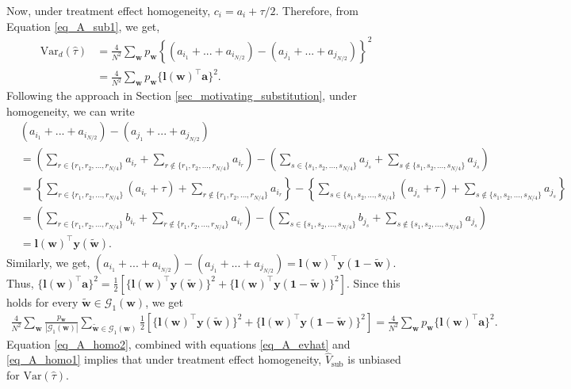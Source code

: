 \documentclass[12pt]{article}
\newcommand{\Var}{{\text{Var}}}
\begin{document}

Now, under treatment effect homogeneity, $c_i = a_i + \tau/2$. Therefore, from Equation \ref{eq_A_sub1}, we get,
\begin{align}
    \Var_d(\hat{\tau}) & = \frac{4}{N^2}\sum_{\bm{w}}p_{\bm{w}} \left\{(a_{i_1}+ ...+ a_{i_{N/2}}) - (a_{j_1}+ ...+ a_{j_{N/2}})\right\}^2 \nonumber \\
    & = \frac{4}{N^2}\sum_{\bm{w}}p_{\bm{w}} \{\bm{l}(\bm{w})^\top \bm{a}\}^2.
    \label{eq_A_homo1}
\end{align}
Following the approach in Section \ref{sec_motivating_substitution}, under homogeneity, we can write 
\begin{align}
&    (a_{i_1}+ ...+ a_{i_{N/2}}) - (a_{j_1}+ ...+ a_{j_{N/2}}) \nonumber \\
& = \left(\sum_{r \in \{r_1,r_2,...,r_{N/4}\}}a_{i_r} + \sum_{r \notin \{r_1,r_2,...,r_{N/4}\}}a_{i_r}\right) - \left(\sum_{s \in \{s_1,s_2,...,s_{N/4}\}}a_{j_s} + \sum_{s \notin \{s_1,s_2,...,s_{N/4}\}}a_{j_s}\right) \nonumber \\
&= \left\{\sum_{r \in \{r_1,r_2,...,r_{N/4}\}}(a_{i_r} + \tau) + \sum_{r \notin \{r_1,r_2,...,r_{N/4}\}}a_{i_r}\right\} - \left\{\sum_{s \in \{s_1,s_2,...,s_{N/4}\}}(a_{j_s} + \tau) + \sum_{s \notin \{s_1,s_2,...,s_{N/4}\}}a_{j_s}\right\} \nonumber \\
&= \left(\sum_{r \in \{r_1,r_2,...,r_{N/4}\}}b_{i_r} + \sum_{r \notin \{r_1,r_2,...,r_{N/4}\}}a_{i_r}\right) - \left(\sum_{s \in \{s_1,s_2,...,s_{N/4}\}}b_{j_s} + \sum_{s \notin \{s_1,s_2,...,s_{N/4}\}}a_{j_s}\right) \nonumber \\
&= \bm{l}(\bm{w})^\top\bm{y}(\tilde{\bm{w}}).
\end{align}
Similarly, we get, $(a_{i_1}+ ...+ a_{i_{N/2}}) - (a_{j_1}+ ...+ a_{j_{N/2}}) =  \bm{l}(\bm{w})^\top\bm{y}(\bm{1} - \tilde{\bm{w}})$. Thus, $\{\bm{l}(\bm{w})^\top\bm{a}\}^2 = \frac{1}{2}[\{\bm{l}(\bm{w})^\top\bm{y}(\tilde{\bm{w}})\}^2 + \{\bm{l}(\bm{w})^\top\bm{y}(\bm{1} - \tilde{\bm{w}})\}^2]$. Since this holds for every $\tilde{\bm{w}} \in \mathcal{G}_1(\bm{w})$, we get 
\begin{align}
    \frac{4}{N^2}\sum_{\bm{w}}\frac{p_{\bm{w}}}{|\mathcal{G}_1(\bm{w})|} \sum_{\tilde{\bm{w}} \in \mathcal{G}_1(\bm{w})} \frac{1}{2}\left[\{\bm{l}(\bm{w})^\top \bm{y}(\tilde{\bm{w}})\}^2 + \{\bm{l}(\bm{w})^\top \bm{y}(\bm{1}-\tilde{\bm{w}})\}^2\right] = \frac{4}{N^2}\sum_{\bm{w}}p_{\bm{w}} \{\bm{l}(\bm{w})^\top \bm{a}\}^2. \label{eq_A_homo2}
\end{align}
Equation \ref{eq_A_homo2}, combined with equations \ref{eq_A_evhat} and \ref{eq_A_homo1} implies that under treatment effect homogeneity, $\hat{V}_{\text{sub}}$ is unbiased for $\Var(\hat{\tau})$.
\end{document}
